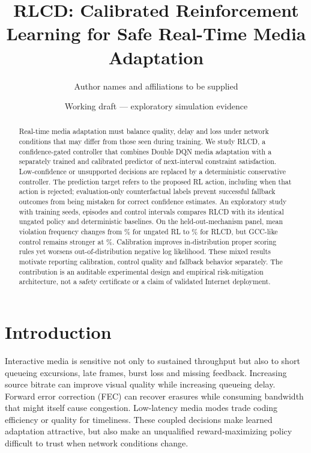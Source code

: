 \documentclass[10pt]{article}
\title{RLCD: Calibrated Reinforcement Learning for Safe Real-Time Media Adaptation}
\author{Author names and affiliations to be supplied}
\date{Working draft --- exploratory simulation evidence}
\begin{document}
\maketitle

\begin{abstract}
Real-time media adaptation must balance quality, delay and loss under network conditions that may differ from those seen during training. We study RLCD, a confidence-gated controller that combines Double DQN media adaptation with a separately trained and calibrated predictor of next-interval constraint satisfaction. Low-confidence or unsupported decisions are replaced by a deterministic conservative controller. The prediction target refers to the proposed RL action, including when that action is rejected; evaluation-only counterfactual labels prevent successful fallback outcomes from being mistaken for correct confidence estimates. An exploratory study with \EvidenceNumSeeds{} training seeds, \EvidenceNumEpisodes{} episodes and \EvidenceNumSteps{} control intervals compares RLCD with its identical ungated policy and deterministic baselines. On the held-out-mechanism panel, mean violation frequency changes from \EvidenceOODRLUnsafePct\% for ungated RL to \EvidenceOODRLCDUnsafePct\% for RLCD, but GCC-like control remains stronger at \EvidenceOODGCCUnsafePct\%. Calibration improves in-distribution proper scoring rules yet worsens out-of-distribution negative log likelihood. These mixed results motivate reporting calibration, control quality and fallback behavior separately. The contribution is an auditable experimental design and empirical risk-mitigation architecture, not a safety certificate or a claim of validated Internet deployment.
\end{abstract}

\section{Introduction}
Interactive media is sensitive not only to sustained throughput but also to short queueing excursions, late frames, burst loss and missing feedback. Increasing source bitrate can improve visual quality while increasing queueing delay. Forward error correction (FEC) can recover erasures while consuming bandwidth that might itself cause congestion. Low-latency media modes trade coding efficiency or quality for timeliness. These coupled decisions make learned adaptation attractive, but also make an unqualified reward-maximizing policy difficult to trust when network conditions change.
\end{document}
